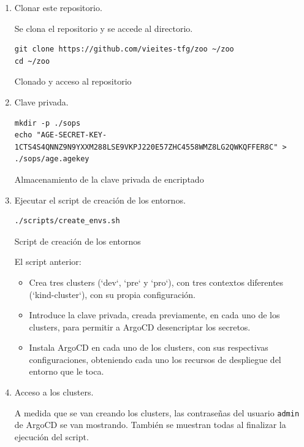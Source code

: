 \begin{enumerate}
  \item Clonar este repositorio.

    Se clona el repositorio y se accede al directorio.

\begin{listing}[!ht]
  \begin{verbatim}
git clone https://github.com/vieites-tfg/zoo ~/zoo
cd ~/zoo
\end{verbatim}
\caption{Clonado y acceso al repositorio}
\end{listing}

\item Clave privada.

\begin{listing}[!ht]
  \begin{verbatim}
mkdir -p ./sops
echo "AGE-SECRET-KEY-1CTS4S4QNNZ9N9YXXM288LSE9VKPJ220E57ZHC4558WMZ8LG2QWKQFFER8C" > ./sops/age.agekey
\end{verbatim}
\caption{Almacenamiento de la clave privada de encriptado}
\end{listing}

  \item Ejecutar el script de creación de los entornos.

\begin{listing}[!ht]
  \begin{verbatim}
./scripts/create_envs.sh
\end{verbatim}
\caption{Script de creación de los entornos}
\end{listing}

    El script anterior:
    \begin{itemize}
      \item Crea tres clusters (`dev`, `pre` y `pro`), con tres contextos diferentes (`kind-{{cluster}}`), con su propia configuración.
      \item Introduce la clave privada, creada previamente, en cada uno de los clusters, para permitir a ArgoCD desencriptar los secretos.
      \item Instala ArgoCD en cada uno de los clusters, con sus respectivas configuraciones, obteniendo cada uno los recursos de despliegue del entorno que le toca.
    \end{itemize}

  \item Acceso a los clusters.

    A medida que se van creando los clusters, las contraseñas del usuario \texttt{admin} de ArgoCD se van mostrando. También se muestran todas al finalizar la ejecución del script.


\end{enumerate}
